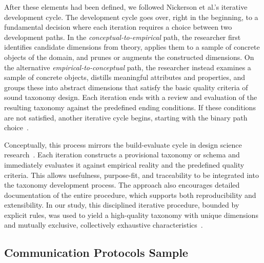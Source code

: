 \documentclass[pdflatex,sn-mathphys-num]{sn-jnl}%
\theoremstyle{thmstyleone}%
\theoremstyle{thmstyletwo}%
\theoremstyle{thmstylethree}%
\begin{document}
After these elements had been defined, we followed Nickerson et al.'s iterative development cycle. 
The development cycle goes over, right in the beginning, to a fundamental decision where each iteration requires a choice between two development paths. 
In the \textit{conceptual-to-empirical} path, the researcher first identifies candidate dimensions from theory, applies them to a sample of concrete objects of the domain, and prunes or augments the constructed dimensions. 
On the alternative \textit{empirical-to-conceptual} path, the researcher instead examines a sample of concrete objects, distills meaningful attributes and properties, and groups these into abstract dimensions that satisfy the basic quality criteria of sound taxonomy design. 
Each iteration ends with a review and evaluation of the resulting taxonomy against the predefined ending conditions.
If these conditions are not satisfied, another iterative cycle begins, starting with the binary path choice~\cite{nickerson2013method}.

Conceptually, this process mirrors the build-evaluate cycle in design science research~\cite{hevner2004design}. 
Each iteration constructs a provisional taxonomy or schema and immediately evaluates it against empirical reality and the predefined quality criteria.
This allows usefulness, purpose-fit, and traceability to be integrated into the taxonomy development process. 
The approach also encourages detailed documentation of the entire procedure, which supports both reproducibility and extensibility. 
In our study, this disciplined iterative procedure, bounded by explicit rules, was used to yield a high-quality taxonomy with unique dimensions and mutually exclusive, collectively exhaustive characteristics~\cite{nickerson2013method,oberlander2019taxonomy}.

\subsection{Communication Protocols Sample}\label{sec:methodology-sample}
\end{document}
